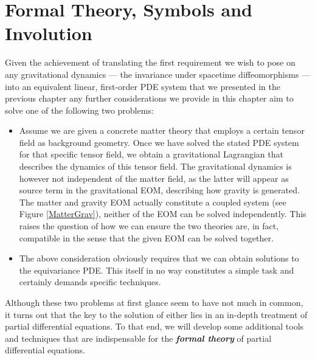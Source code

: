 \section{Formal Theory, Symbols and Involution}
Given the achievement of translating the first requirement we wish to pose on any gravitational dynamics --- the invariance under spacetime diffeomorphisms --- into an equivalent linear, first-order PDE system that we presented in the previous chapter any further considerations we provide in this chapter aim to solve one of the following two problems:
\begin{itemize}
    \item Assume we are given a concrete matter theory that employs a certain tensor field as background geometry. Once we have solved the stated PDE system for that specific tensor field, we obtain a gravitational Lagrangian that describes the dynamics of this tensor field. The gravitational dynamics is however not independent of the matter field, as the latter will appear as source term in the gravitational EOM, describing how gravity is generated.
    The matter and gravity EOM actually constitute a coupled system (see Figure \ref{MatterGrav}), neither of the EOM can be solved independently. This raises the question of how we can ensure the two theories are, in fact, compatible in the sense that the given EOM can be solved together.
    \item The above consideration obviously requires that we can obtain solutions to the equivariance PDE. This itself in no way constitutes a simple task and certainly demands specific techniques.
\end{itemize}
Although these two problems at first glance seem to have not much in common, it turns out that the key to the solution of either lies in an in-depth treatment of partial differential equations. 
To that end, we will develop some additional tools and techniques that are indispensable for the  \textit{\textbf{formal theory}} of partial differential equations.

